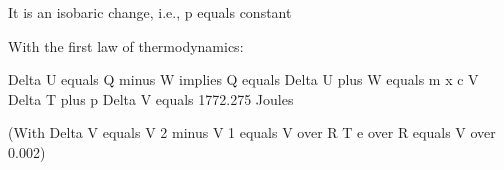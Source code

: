 It is an isobaric change, i.e., p equals constant

With the first law of thermodynamics:

Delta U equals Q minus W implies Q equals Delta U plus W equals m x c V Delta T plus p Delta V equals 1772.275 Joules

(With Delta V equals V 2 minus V 1 equals V over R T e over R equals V over 0.002)